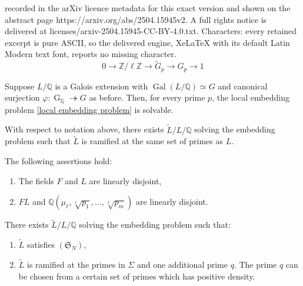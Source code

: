 \documentclass[10pt,a4paper]{amsart}
\newcommand{\Q}{\mathbb{Q}}
\newcommand{\op}[1]{\operatorname{#1}}
\begin{document}
recorded in the arXiv licence metadata for this exact version and shown on the abstract page https://arxiv.org/abs/2504.15945v2. A full rights notice is delivered at licenses/arxiv-2504.15945-CC-BY-4.0.txt. Characters: every retained excerpt is pure ASCII, so the delivered engine, XeLaTeX with its default Latin Modern text font, reports no missing character.
\begin{equation}\label{local embedding problem}
0 \to \mathbb{Z}/\ell\mathbb{Z} \to \widetilde{G}_p \to G_p \to 1
\end{equation}

\begin{proposition}\label{local extension is solvable}
     Suppose \( L/\mathbb{Q} \) is a Galois extension with \(\op{Gal}(L/\Q)\simeq  G \) and canonical surjection \( \varphi : \op{G}_{\Q}\twoheadrightarrow G\) as before. Then, for every prime \( p \), the local embedding problem \eqref{local embedding problem} is solvable. 
\end{proposition}

\begin{proposition}\label{step 2 propn}
    With respect to notation above, there exists $\widetilde{L}/L/\Q$ solving the embedding problem such that $\widetilde{L}$ is ramified at the same set of primes as $L$.
\end{proposition}

\begin{lemma}\label{linear disj lemma}
The following assertions hold:
\begin{enumerate}
    \item[(i)] The fields $F$ and $L$ are linearly disjoint,
    \item[(ii)] $FL$ and $\Q(\mu_\ell, \sqrt[\ell]{p_1}, \dots, \sqrt[\ell]{p_m})$ are linearly disjoint. 
\end{enumerate}
\end{lemma}

\begin{proposition}\label{constructing tilde L satisfying SN}
    There exists $\widetilde{L}/L/\Q$ solving the embedding problem such that:
    \begin{enumerate}
        \item $\widetilde{L}$ satisfies $(\mathfrak{S}_N)$,
        \item $\widetilde{L}$ is ramified at the primes in $\Sigma$ and one additional prime $q$. The prime $q$ can be chosen from a certain set of primes which has positive density.
    \end{enumerate}
     
\end{proposition}
\end{document}
